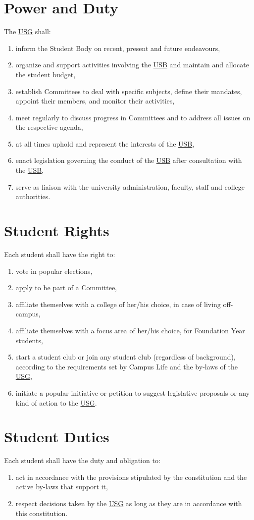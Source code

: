 \section{Power and Duty}
The \hyperref[USGdef]{USG} shall: 
\begin{enumerate}
\item inform the Student Body on recent, present and future endeavours,
\item organize and support activities involving the \hyperref[studentbody]{USB} and maintain and allocate the student budget,
\item establish Committees to deal with specific subjects, define their mandates, appoint their members, and monitor their activities,
\item meet regularly to discuss progress in Committees and to address all issues on the respective agenda,
\item at all times uphold and represent the interests of the \hyperref[studentbody]{USB},
\item enact legislation governing the conduct of the \hyperref[studentbody]{USB} after consultation with the \hyperref[studentbody]{USB},
\item serve as liaison with the university administration, faculty, staff and college authorities.
\end{enumerate}

\section{Student Rights}
Each student shall have the right to:
\begin{enumerate}[nosep] 
\item vote in popular elections,
\item apply to be part of a Committee,
\item affiliate themselves with a college of her/his choice, in case of living off-campus,
\item affiliate themselves with a focus area of her/his choice, for Foundation Year students,
\item start a student club or join any student club (regardless of background), according to the requirements set by Campus Life and the by-laws of the \hyperref[USGdef]{USG},
\item initiate a popular initiative or petition to suggest legislative proposals or any kind of action to the \hyperref[USGdef]{USG}.
\end{enumerate}

\section{Student Duties}
Each student shall have the duty and obligation to:
\begin{enumerate}
\item act in accordance with the provisions stipulated by the constitution and the active by-laws that support it,
\item respect decisions taken by the \hyperref[USGdef]{USG} as long as they are in accordance with this constitution.
\end{enumerate}